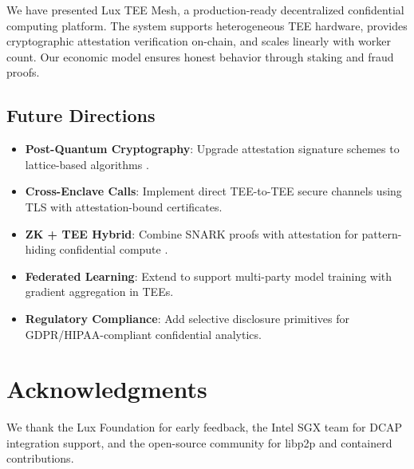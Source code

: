 \documentclass[11pt,letterpaper]{article}
\begin{document}
We have presented Lux TEE Mesh, a production-ready decentralized confidential computing platform. The system supports heterogeneous TEE hardware, provides cryptographic attestation verification on-chain, and scales linearly with worker count. Our economic model ensures honest behavior through staking and fraud proofs.

\subsection{Future Directions}

\begin{itemize}
  \item \textbf{Post-Quantum Cryptography}: Upgrade attestation signature schemes to lattice-based algorithms \cite{nist-pqc}.

  \item \textbf{Cross-Enclave Calls}: Implement direct TEE-to-TEE secure channels using TLS with attestation-bound certificates.

  \item \textbf{ZK + TEE Hybrid}: Combine SNARK proofs with attestation for pattern-hiding confidential compute \cite{zk-tee-hybrid}.

  \item \textbf{Federated Learning}: Extend to support multi-party model training with gradient aggregation in TEEs.

  \item \textbf{Regulatory Compliance}: Add selective disclosure primitives for GDPR/HIPAA-compliant confidential analytics.
\end{itemize}

\section*{Acknowledgments}

We thank the Lux Foundation for early feedback, the Intel SGX team for DCAP integration support, and the open-source community for libp2p and containerd contributions.
\end{document}
